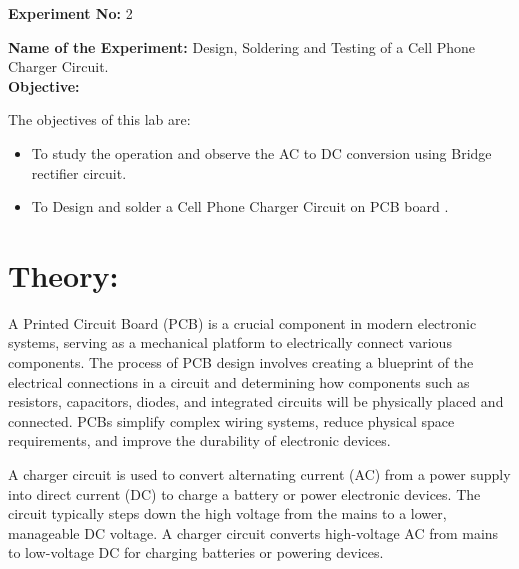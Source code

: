 \documentclass[a4paper,12pt]{article}
\begin{document}
	\textbf{Experiment No:} 2

\textbf{Name of the Experiment:} 
Design, Soldering and Testing of a Cell Phone Charger Circuit. \\
\textbf{Objective:}

	
	The objectives of this lab are:
	\begin{itemize}
		\item To study the operation and observe the AC to DC conversion using Bridge rectifier circuit.
		\item To Design and solder a Cell Phone Charger Circuit on PCB board .
		
		
	\end{itemize}

\section*{Theory:}

A Printed Circuit Board (PCB) is a crucial component in modern electronic systems, serving as a mechanical platform to electrically connect various components. The process of PCB design involves creating a blueprint of the electrical connections in a circuit and determining how components such as resistors, capacitors, diodes, and integrated circuits will be physically placed and connected. PCBs simplify complex wiring systems, reduce physical space requirements, and improve the durability of electronic devices.

A charger circuit is used to convert alternating current (AC) from a power supply into direct current (DC) to charge a battery or power electronic devices. The circuit typically steps down the high voltage from the mains to a lower, manageable DC voltage. A charger circuit converts high-voltage AC from mains to low-voltage DC for charging batteries or powering devices.

	
\end{document}
